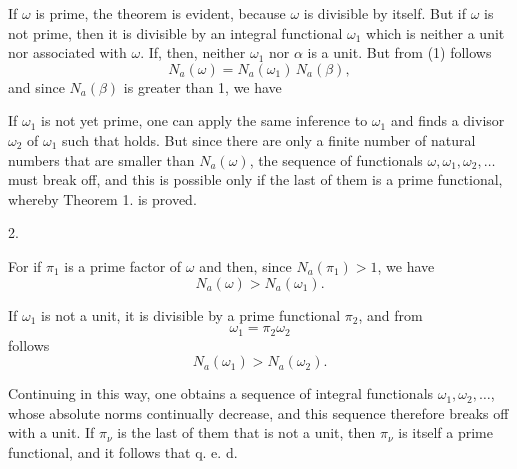 If $\omega$ is prime, the theorem is evident, because $\omega$ is divisible by itself. But if $\omega$ is not prime, then it is divisible by an integral functional $\omega_1$ which is neither a unit nor associated with $\omega$. If, then,
neither $\omega_1$ nor $\alpha$ is a unit. But from (1) follows
\[
N_a(\omega) = N_a(\omega_1)\, N_a(\beta), %
\]
and since $N_a(\beta)$ is greater than 1, we have

If $\omega_1$ is not yet prime, one can apply the same inference to $\omega_1$ and finds a divisor $\omega_2$ of $\omega_1$ such that
holds. But since there are only a finite number of natural numbers that are smaller than $N_a(\omega)$, the sequence of functionals $\omega, \omega_1, \omega_2, \ldots$ must break off, and this is possible only if the last of them is a prime functional, whereby Theorem 1. is proved.

2. 

For if $\pi_1$ is a prime factor of $\omega$ and
then, since $N_a(\pi_1) > 1$, we have
\[
N_a(\omega) > N_a(\omega_1).
\]

If $\omega_1$ is not a unit, it is divisible by a prime functional $\pi_2$, and from
\[
\omega_1 = \pi_2 \omega_2
\]
follows
\[
N_a(\omega_1) > N_a(\omega_2).
\]

Continuing in this way, one obtains a sequence of integral functionals $\omega_1, \omega_2, \ldots$, whose absolute norms continually decrease, and this sequence therefore breaks off with a unit. If $\pi_\nu$ is the last of them that is not a unit, then $\pi_\nu$ is itself a prime functional, and it follows that
q. e. d.
